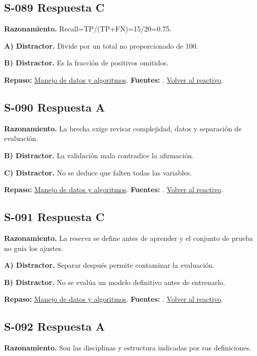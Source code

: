 \subsection*{S-089 \quad Respuesta C}\label{s:S-089}
\textbf{Razonamiento.} Recall=TP/(TP+FN)=15/20=0.75.

\textbf{A) Distractor. }Divide por un total no proporcionado de 100.

\textbf{B) Distractor. }Es la fracción de positivos omitidos.

\textbf{Repaso:} \hyperref[sec:s3]{Manejo de datos y algoritmos}. \textbf{Fuentes:} \cite{algorithms,postgres,ai}. \hyperref[q:S-089]{Volver al reactivo}.\par\medskip

\subsection*{S-090 \quad Respuesta A}\label{s:S-090}
\textbf{Razonamiento.} La brecha exige revisar complejidad, datos y separación de evaluación.

\textbf{B) Distractor. }La validación mala contradice la afirmación.

\textbf{C) Distractor. }No se deduce que falten todas las variables.

\textbf{Repaso:} \hyperref[sec:s3]{Manejo de datos y algoritmos}. \textbf{Fuentes:} \cite{algorithms,postgres,ai}. \hyperref[q:S-090]{Volver al reactivo}.\par\medskip

\subsection*{S-091 \quad Respuesta C}\label{s:S-091}
\textbf{Razonamiento.} La reserva se define antes de aprender y el conjunto de prueba no guía los ajustes.

\textbf{A) Distractor. }Separar después permite contaminar la evaluación.

\textbf{B) Distractor. }No se evalúa un modelo definitivo antes de entrenarlo.

\textbf{Repaso:} \hyperref[sec:s3]{Manejo de datos y algoritmos}. \textbf{Fuentes:} \cite{algorithms,postgres,ai}. \hyperref[q:S-091]{Volver al reactivo}.\par\medskip

\subsection*{S-092 \quad Respuesta A}\label{s:S-092}
\textbf{Razonamiento.} Son las disciplinas y estructura indicadas por sus definiciones.


